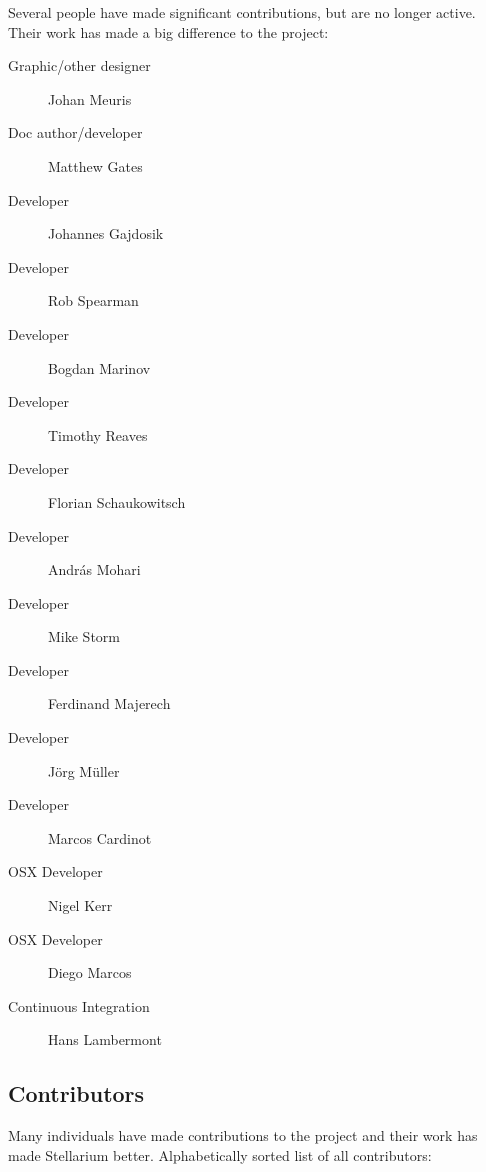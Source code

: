 Several people have made significant contributions, but are no longer active. Their work has made a big difference to the project:
\begin{description}
\item[Graphic/other designer] Johan Meuris
\item[Doc author/developer] Matthew Gates
\item[Developer] Johannes Gajdosik
\item[Developer] Rob Spearman
\item[Developer] Bogdan Marinov
\item[Developer] Timothy Reaves
\item[Developer] Florian Schaukowitsch
\item[Developer] András Mohari
\item[Developer] Mike Storm
\item[Developer] Ferdinand Majerech
\item[Developer] Jörg Müller
\item[Developer] Marcos Cardinot
\item[OSX Developer] Nigel Kerr
\item[OSX Developer] Diego Marcos
\item[Continuous Integration] Hans Lambermont
\end{description}

\subsection{Contributors}

Many individuals have made contributions to the project and their work has made Stellarium better. Alphabetically sorted list of all contributors:


